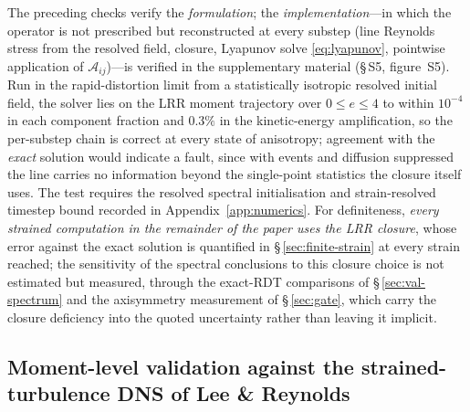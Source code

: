 \documentclass[lineno]{JFM-FLM_Au}
\begin{document}
The preceding checks verify the \emph{formulation}; the
\emph{implementation}---in which the operator is not prescribed but
reconstructed at every substep (line Reynolds stress from the resolved
field, closure, Lyapunov solve \eqref{eq:lyapunov}, pointwise
application of $\mathcal{A}_{ij}$)---is verified in the supplementary
material (\S\,S5, figure~S5). Run in the rapid-distortion limit from a
statistically isotropic resolved initial field, the solver lies on the
LRR moment trajectory over $0\le e\le4$ to within $10^{-4}$ in each
component fraction and $0.3\%$ in the kinetic-energy amplification, so
the per-substep chain is correct at every state of anisotropy;
agreement with the \emph{exact} solution would indicate a fault, since
with events and diffusion suppressed the line carries no information
beyond the single-point statistics the closure itself uses. The test
requires the resolved spectral initialisation and strain-resolved
timestep bound recorded in Appendix~\ref{app:numerics}. For
definiteness, \emph{every strained computation in the remainder of the
paper uses the LRR closure}, whose error against the exact solution is
quantified in \S\,\ref{sec:finite-strain} at every strain reached; the
sensitivity of the spectral conclusions to this closure choice is not
estimated but measured, through the exact-RDT comparisons of
\S\,\ref{sec:val-spectrum} and the axisymmetry measurement of
\S\,\ref{sec:gate}, which carry the closure deficiency into the quoted
uncertainty rather than leaving it implicit.

\subsection{Moment-level validation against the strained-turbulence DNS
of Lee \& Reynolds}\label{sec:lr-validation}\label{sec:lr-plane}
\end{document}
